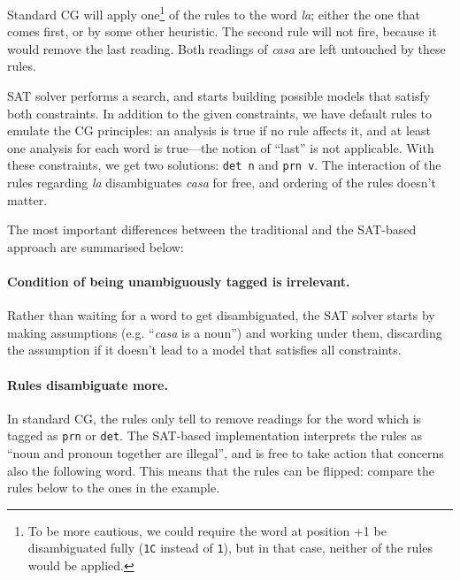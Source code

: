 \documentclass[11pt]{article}
\begin{document}
Standard CG will apply one\footnote{To be more cautious, we could require the word at position +1 be disambiguated fully (\texttt{1C} instead of \texttt{1}), but in that case, 
neither of the rules would be applied.} of the rules to the word \emph{la}; 
either the one that comes first, or by some other heuristic. 
The second rule will not fire, because it would remove the last reading. 
Both readings of \emph{casa} are left untouched by these rules.

SAT solver 
performs a search, 
and starts building possible models that satisfy both constraints. 
In addition to the given constraints, we have default rules to emulate
the CG principles: an analysis is true if no rule affects it,
and at least one analysis for each word is true---the notion of ``last'' is not applicable.
With these constraints, we get two solutions: \texttt{det n} and \texttt{prn v}. 
The interaction of the rules regarding \emph{la}  disambiguates \emph{casa} 
for free, and ordering of the rules doesn't matter. 


The most important differences between the traditional and the SAT-based approach are summarised below:

\paragraph{Condition of being unambiguously tagged is irrelevant.}
Rather than waiting for a word to get disambiguated, the SAT solver starts by 
making assumptions (e.g. ``\emph{casa} is a noun'') and working under them,
discarding the assumption if it doesn't lead to a model that satisfies all constraints.


\paragraph{Rules disambiguate more.}
In standard CG, the rules only tell to remove readings for the word which is tagged as 
\texttt{prn} or \texttt{det}. The SAT-based implementation interprets the rules as ``noun and pronoun together are illegal'', and is free to take action that concerns also the following word.
This means that the rules can be flipped: compare the rules below to the ones in the example.
\end{document}
